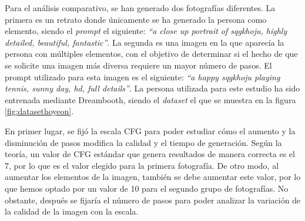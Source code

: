 Para el análisis comparativo, se han generado dos fotografías diferentes. La primera es un retrato donde únicamente se ha generado la persona como elemento, siendo el \textit{prompt} el siguiente: \textit{``a close up portrait of sqgkhoju, highly detailed, beautiful, fantastic''}. La segunda es una imagen en la que aparecía la persona con múltiples elementos, con el objetivo de determinar si el hecho de que se solicite una imagen más diversa requiere un mayor número de pasos. El prompt utilizado para esta imagen es el siguiente: \textit{``a happy sqgkhoju playing tennis, sunny day, hd, full details''}. La persona utilizada para este estudio ha sido entrenada mediante Dreambooth, siendo el \textit{dataset} el que se  muestra en la figura \ref{fig:datasethoyeon}.

En primer lugar, se fijó la escala CFG para poder estudiar cómo el aumento y la disminución de pasos modifica la calidad y el tiempo de generación. Según la teoría, un valor de CFG estándar que genera resultados de manera correcta es el 7, por lo que es el valor elegido para la primera fotografía. De otro modo, al aumentar los elementos de la imagen, también se debe aumentar este valor, por lo que hemos optado por un valor de 10 para el segundo grupo de fotografías. No obstante, después se fijaría el número de pasos para poder analizar la variación de la calidad de la imagen con la escala.



